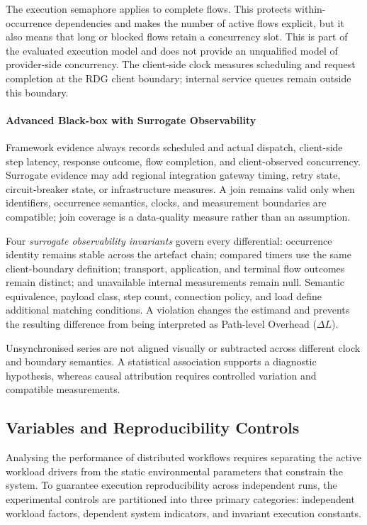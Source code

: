 \noindent The execution semaphore applies to complete flows. This protects
within-occurrence dependencies and makes the number of active flows explicit,
but it also means that long or blocked flows retain a concurrency slot. This is
part of the evaluated execution model and does not provide an unqualified model
of provider-side concurrency. The client-side clock measures scheduling and
request completion at the RDG client boundary; internal service queues remain outside
this boundary.

\paragraph{Advanced Black-box with Surrogate Observability}
\noindent Framework evidence always records scheduled and actual dispatch, client-side
step latency, response outcome, flow completion, and client-observed
concurrency. Surrogate evidence may add regional integration gateway timing, retry state,
circuit-breaker state, or infrastructure measures. A join remains valid
only when identifiers, occurrence semantics, clocks, and measurement boundaries
are compatible; join coverage is a data-quality measure rather than an
assumption.

\noindent Four \emph{surrogate observability invariants} govern every differential:
occurrence identity remains stable across the artefact chain; compared timers
use the same client-boundary definition; transport, application, and terminal
flow outcomes remain distinct; and unavailable internal measurements remain
null. Semantic equivalence, payload class, step count, connection policy, and
load define additional matching conditions. A violation changes the estimand
and prevents the resulting difference from being interpreted as Path-level
Overhead ($\Delta L$).

\noindent Unsynchronised series are not aligned visually or subtracted across different
clock and boundary semantics. A statistical association supports a diagnostic
hypothesis, whereas causal attribution requires controlled variation and
compatible measurements.

\subsection{Variables and Reproducibility Controls}
\label{subsec:rdg-variables-reproducibility}

\noindent Analysing the performance of distributed workflows requires separating the
active workload drivers from the static environmental parameters that constrain
the system. To guarantee execution reproducibility across independent runs,
the experimental controls are partitioned into three primary categories:
independent workload factors, dependent system indicators, and invariant
execution constants.

